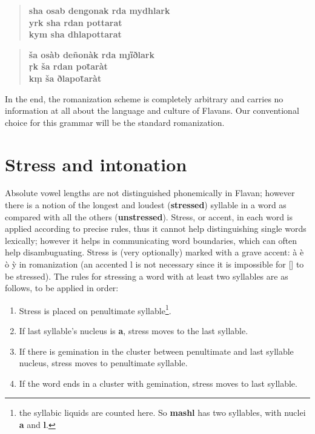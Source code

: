 \documentclass[10pt,oneside]{memoir}
\newcommand{\apa}[1]{[\textipa{#1}]}
\begin{document}
\begin{verse}\textbf{sha osab dengonak rda mydhlark\\yrk sha rdan pottarat\\kym sha dhlapottarat}\end{verse}

\begin{verse}\textbf{\v{s}a osàb de\~nonàk rda m{\j}ȉðlark\\\d{r}k \v{s}a rdan po\=taràt\\k\d{m} \v{s}a ðlapo\=taràt}\end{verse}


In the end, the romanization scheme is completely arbitrary and carries no information at all about the language and culture of Flavans. Our conventional choice for this grammar will be the standard romanization.

\section{Stress and intonation}

Absolute vowel lengths are not distinguished phonemically in Flavan; however there is a notion of the longest and loudest (\textbf{stressed}) syllable in a word as compared with all the others (\textbf{unstressed}). Stress, or accent, in each word is applied according to precise rules, thus it cannot help distinguishing single words lexically; however it helps in communicating word boundaries, which can often help disambuguating. Stress is (very optionally) marked with a grave accent: \`a \`e \`o \`y in romanization (an accented l is not necessary since it is impossible for \apa{\s{l}} to be stressed). The rules for stressing a word with at least two syllables are as follows, to be applied in order:

\begin{enumerate}
	\item Stress is placed on penultimate syllable\footnote{the syllabic liquids are counted here. So \textbf{mashl} has two syllables, with nuclei \textbf{a} and \textbf{l}.}.
	\item If last syllable's nucleus is \textbf{a}, stress moves to the last syllable.
	\item If there is gemination in the cluster between penultimate and last syllable nucleus, stress moves to penultimate syllable.
	\item If the word ends in a cluster with gemination, stress moves to last syllable.
\end{enumerate}
\end{document}
